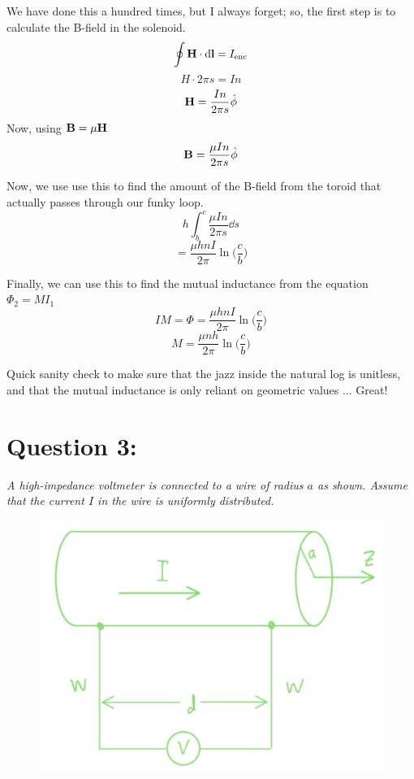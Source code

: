 \documentclass[12pt]{article}
\begin{document}
We have done this a hundred times, but I always forget; so, the first step is to calculate the B-field in the solenoid.
\[\oint \vb{H} \cdot \dd{\vb{l}} = I_\text{enc}\]
\[H\cdot 2 \pi s = In\]
\[\vb{H} = \frac{In}{2 \pi s} \hat{\phi}\]
Now, using $\vb{B} = \mu \vb{H}$ 
\[\vb{B} = \frac{\mu In}{2 \pi s} \hat{\phi}\]\bigskip

Now, we use use this to find the amount of the B-field from the toroid that actually passes through our funky loop.
\[h\int_b^c \frac{\mu I n}{2 \pi s} \dd{s}\]
\[=\frac{\mu h n I}{2 \pi}\ln\Big(\frac{c}{b}\Big)\]
\bigskip

Finally, we can use this to find the mutual inductance from the equation $\Phi_2 = M I_1$
\[IM = \Phi = \frac{\mu h n I}{2 \pi} \ln \Big(\frac{c}{b}\Big)\]
\[M = \frac{\mu n h}{2 \pi} \ln\Big(\frac{c}{b}\Big)\]

Quick sanity check to make sure that the jazz inside the natural log is unitless, and that the mutual inductance is only reliant on geometric values ... Great!

\newpage

\section*{Question 3:}
\emph{A high-impedance voltmeter is connected to a wire of radius $a$ as shown. Assume that the current $I$ in the wire is uniformly distributed.}
\begin{figure}[h]
\centering
\includegraphics[scale=.5]{exam02_question3.png}
\label{fig:3.1}
\end{figure}
\end{document}
